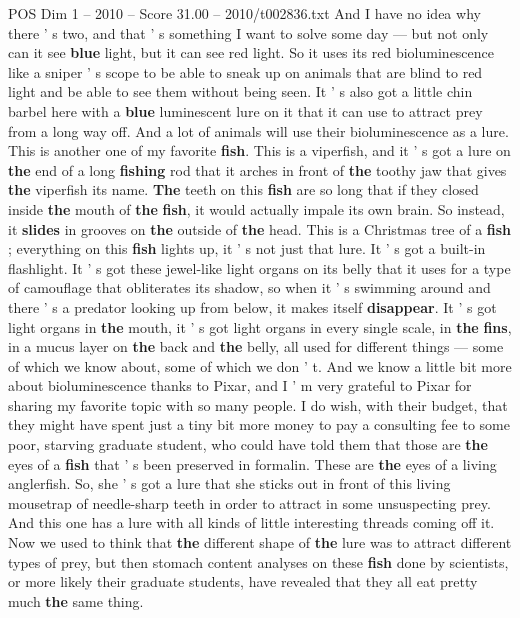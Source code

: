 \begin{textsample}{POS Dim 1 – 2010 – Score 31.00 – 2010/t002836.txt}
And I have no idea why there ' s two, and that ' s something I want to solve some day — but not only can it see \textbf{blue} light, but it can see red light.
So it uses its red bioluminescence like a sniper ' s scope to be able to sneak up on animals that are blind to red light and be able to see them without being seen.
It ' s also got a little chin barbel here with a \textbf{blue} luminescent lure on it that it can use to attract prey from a long way off.
And a lot of animals will use their bioluminescence as a lure.
This is another one of my favorite \textbf{fish}.
This is a viperfish, and it ' s got a lure on \textbf{the} end of a long \textbf{fishing} rod that it arches in front of \textbf{the} toothy jaw that gives \textbf{the} viperfish its name. \textbf{The} teeth on this \textbf{fish} are so long that if they closed inside \textbf{the} mouth of \textbf{the} \textbf{fish}, it would actually impale its own brain.
So instead, it \textbf{slides} in grooves on \textbf{the} outside of \textbf{the} head.
This is a Christmas tree of a \textbf{fish} ; everything on this \textbf{fish} lights up, it ' s not just that lure.
It ' s got a built-in flashlight.
It ' s got these jewel-like light organs on its belly that it uses for a type of camouflage that obliterates its shadow, so when it ' s swimming around and there ' s a predator looking up from below, it makes itself \textbf{disappear}.
It ' s got light organs in \textbf{the} mouth, it ' s got light organs in every single scale, in \textbf{the} \textbf{fins}, in a mucus layer on \textbf{the} back and \textbf{the} belly, all used for different things — some of which we know about, some of which we don ' t.
And we know a little bit more about bioluminescence thanks to Pixar, and I ' m very grateful to Pixar for sharing my favorite topic with so many people.
I do wish, with their budget, that they might have spent just a tiny bit more money to pay a consulting fee to some poor, starving graduate student, who could have told them that those are \textbf{the} eyes of a \textbf{fish} that ' s been preserved in formalin.
These are \textbf{the} eyes of a living anglerfish.
So, she ' s got a lure that she sticks out in front of this living mousetrap of needle-sharp teeth in order to attract in some unsuspecting prey.
And this one has a lure with all kinds of little interesting threads coming off it.
Now we used to think that \textbf{the} different shape of \textbf{the} lure was to attract different types of prey, but then stomach content analyses on these \textbf{fish} done by scientists, or more likely their graduate students, have revealed that they all eat pretty much \textbf{the} same thing.

\end{textsample}
